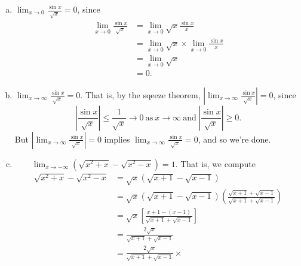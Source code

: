 \documentclass[12pt]{article}
\begin{document}
\begin{enumerate}[a)]
\item{}
  \qquad $ \lim_{x \to 0} \displaystyle \frac{\sin x}{\sqrt{x}} = 0$, since 
  \begin{equation*}
    \begin{split}
\lim_{x \to 0} \displaystyle \frac{\sin x}{\sqrt{x}} & =
    \lim_{x \to 0} \sqrt{x} \frac{\sin x}{x} 
    \\
    & = \lim_{x \to 0 } \sqrt{x} \times
  \lim_{x \to 0} \frac{\sin x}{x} 
  \\
  & = \lim_{x \to 0 } \sqrt{x} 
  \\
  & = 0.
\end{split}
\end{equation*}
    \item{}
        \vspace{4em}
    \qquad $ \displaystyle \lim_{x \to \infty} \displaystyle \frac{\sin
    x}{\sqrt{x}}= 0$. That is, by the sqeeze theorem, $ | \displaystyle \lim_{x \to \infty}\frac{\sin x}{\sqrt{x}}|= 0$, since
    \begin{equation*}
      | \displaystyle \frac{\sin x}{\sqrt{x}}| \le \frac{1}{\sqrt{x}} \to 0 \ \text{as} \ x
      \to \infty \ \text{and} \ | \displaystyle \frac{\sin x}{\sqrt{x}}| \ge 0.
    \end{equation*} 
\qquad But $ | \displaystyle \lim_{x \to \infty}\frac{\sin x}{\sqrt{x}}|= 0$ implies 
$ \displaystyle \lim_{x \to \infty} \displaystyle \frac{\sin
    x}{\sqrt{x}}= 0$, and so we're done.
    \item{}
        \vspace{4em}
        $ \qquad \displaystyle \lim_{x \to -\infty}(\sqrt{x^2 + x} - \sqrt{x^2
        - x}) =1$. That is, we compute
        \begin{equation*}
        \begin{split}
        \sqrt{x^2 + x} - \sqrt{x^2
        - x} & = \sqrt{x}\left( \sqrt{x+1} - \sqrt{x-1} \right)
        \\
        & = \sqrt{x}\left( \sqrt{x+1} - \sqrt{x-1} \right)\left( \frac{\sqrt{x+1} + \sqrt{x-1}}{\sqrt{x+1} + \sqrt{x-1}} \right)
        \\
        & = \sqrt{x} \left[ \frac{x+1 - (x-1)}{\sqrt{x+1} + \sqrt{x-1}} \right]
        \\
        & = \frac{2 \sqrt{x}}{\sqrt{x+1} + \sqrt{x-1}}
        \\
        & = \frac{2 \sqrt{x}}{\sqrt{x+1} + \sqrt{x-1}} \times

\end{split}
\end{equation*}
\end{enumerate}
\end{document}
